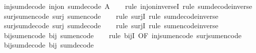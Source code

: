 \begin{isabellebody}
\endisatagproof
{\isafoldproof}%
%
\isadelimproof
\isanewline
%
\endisadelimproof
\isanewline
{}\isamarkupfalse%
\ inj{\isacharunderscore}sum{\isacharunderscore}decode{\isacharcolon}\ {\isachardoublequoteopen}inj{\isacharunderscore}on\ sum{\isacharunderscore}decode\ A{\isachardoublequoteclose}\isanewline
%
\isadelimproof
\ \ %
\endisadelimproof
%
\isatagproof
{}\isamarkupfalse%
\ {\isacharparenleft}rule\ inj{\isacharunderscore}on{\isacharunderscore}inverseI{\isacharparenright}\ {\isacharparenleft}rule\ sum{\isacharunderscore}decode{\isacharunderscore}inverse{\isacharparenright}%
\endisatagproof
{\isafoldproof}%
%
\isadelimproof
\isanewline
%
\endisadelimproof
\isanewline
{}\isamarkupfalse%
\ surj{\isacharunderscore}sum{\isacharunderscore}encode{\isacharcolon}\ {\isachardoublequoteopen}surj\ sum{\isacharunderscore}encode{\isachardoublequoteclose}\isanewline
%
\isadelimproof
\ \ %
\endisadelimproof
%
\isatagproof
{}\isamarkupfalse%
\ {\isacharparenleft}rule\ surjI{\isacharparenright}\ {\isacharparenleft}rule\ sum{\isacharunderscore}decode{\isacharunderscore}inverse{\isacharparenright}%
\endisatagproof
{\isafoldproof}%
%
\isadelimproof
\isanewline
%
\endisadelimproof
\isanewline
{}\isamarkupfalse%
\ surj{\isacharunderscore}sum{\isacharunderscore}decode{\isacharcolon}\ {\isachardoublequoteopen}surj\ sum{\isacharunderscore}decode{\isachardoublequoteclose}\isanewline
%
\isadelimproof
\ \ %
\endisadelimproof
%
\isatagproof
{}\isamarkupfalse%
\ {\isacharparenleft}rule\ surjI{\isacharparenright}\ {\isacharparenleft}rule\ sum{\isacharunderscore}encode{\isacharunderscore}inverse{\isacharparenright}%
\endisatagproof
{\isafoldproof}%
%
\isadelimproof
\isanewline
%
\endisadelimproof
\isanewline
{}\isamarkupfalse%
\ bij{\isacharunderscore}sum{\isacharunderscore}encode{\isacharcolon}\ {\isachardoublequoteopen}bij\ sum{\isacharunderscore}encode{\isachardoublequoteclose}\isanewline
%
\isadelimproof
\ \ %
\endisadelimproof
%
\isatagproof
{}\isamarkupfalse%
\ {\isacharparenleft}rule\ bijI\ {\isacharbrackleft}OF\ inj{\isacharunderscore}sum{\isacharunderscore}encode\ surj{\isacharunderscore}sum{\isacharunderscore}encode{\isacharbrackright}{\isacharparenright}%
\endisatagproof
{\isafoldproof}%
%
\isadelimproof
\isanewline
%
\endisadelimproof
\isanewline
{}\isamarkupfalse%
\ bij{\isacharunderscore}sum{\isacharunderscore}decode{\isacharcolon}\ {\isachardoublequoteopen}bij\ sum{\isacharunderscore}decode{\isachardoublequoteclose}\isanewline
%
\isadelimproof

\end{isabellebody}
